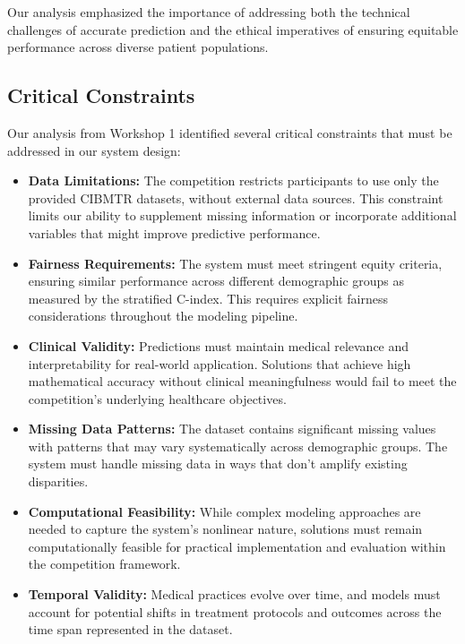 Our analysis emphasized the importance of addressing both the technical challenges of accurate prediction and the ethical imperatives of ensuring equitable performance across diverse patient populations.

\subsection{Critical Constraints}

Our analysis from Workshop 1 identified several critical constraints that must be addressed in our system design:

\begin{itemize}
    \item \textbf{Data Limitations:} The competition restricts participants to use only the provided CIBMTR datasets, without external data sources. This constraint limits our ability to supplement missing information or incorporate additional variables that might improve predictive performance.
    
    \item \textbf{Fairness Requirements:} The system must meet stringent equity criteria, ensuring similar performance across different demographic groups as measured by the stratified C-index. This requires explicit fairness considerations throughout the modeling pipeline.
    
    \item \textbf{Clinical Validity:} Predictions must maintain medical relevance and interpretability for real-world application. Solutions that achieve high mathematical accuracy without clinical meaningfulness would fail to meet the competition's underlying healthcare objectives.
    
    \item \textbf{Missing Data Patterns:} The dataset contains significant missing values with patterns that may vary systematically across demographic groups. The system must handle missing data in ways that don't amplify existing disparities.
    
    \item \textbf{Computational Feasibility:} While complex modeling approaches are needed to capture the system's nonlinear nature, solutions must remain computationally feasible for practical implementation and evaluation within the competition framework.
    
    \item \textbf{Temporal Validity:} Medical practices evolve over time, and models must account for potential shifts in treatment protocols and outcomes across the time span represented in the dataset.
\end{itemize}

